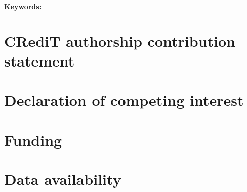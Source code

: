 \documentclass[12pt]{article}
\title{%
}
\author{%
}
\date{}
\begin{document}
\maketitle

\begin{abstract}
\end{abstract}

\noindent\textbf{Keywords:} %








\section*{CRediT authorship contribution statement}

\section*{Declaration of competing interest}

\section*{Funding}

\section*{Data availability}
\end{document}
